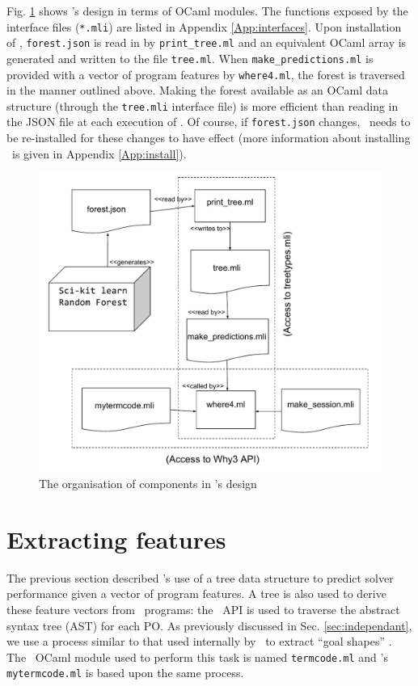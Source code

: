Fig. \ref{fig:Chapter5} shows \where's design in terms of OCaml modules.
The functions exposed by the interface files (\texttt{*.mli}) are listed in Appendix \ref{App:interfaces}. 
Upon installation of \where, \texttt{forest.json} is read in by \texttt{print\_tree.ml} and an equivalent OCaml array is generated and written to the file \texttt{tree.ml}.
When \texttt{make\_predictions.ml} is provided with a vector of program features by \texttt{where4.ml}, the forest is traversed  in the manner outlined above.
Making the forest available as an OCaml data structure (through the \texttt{tree.mli} interface file) is more efficient than reading in the JSON file at each execution of \where.
Of course, if \texttt{forest.json} changes, \where~needs to be re-installed for these changes to have effect (more information about installing \where~is given in Appendix \ref{App:install}).  


\begin{figure}
	\centering
	\includegraphics[width=1.0\linewidth]{Figures/Chapter5_stereo}
	\caption[\where~modules]{The organisation of components in \where's design}
	\label{fig:Chapter5}
\end{figure}

\section{Extracting features}

The previous section described \where's use of a tree data structure to predict solver performance given a vector of program features.
A tree is also used to derive these feature vectors from \why~programs: the \why~API is used to traverse the abstract syntax tree (AST) for each PO.
As previously discussed in Sec. \ref{sec:independant}, we use a process similar to that used internally by \why~to extract ``goal shapes'' \cite{why:preserving}.
The \why~OCaml module used to perform this task is named \texttt{termcode.ml} and \where's \texttt{mytermcode.ml} is based upon the same process.

